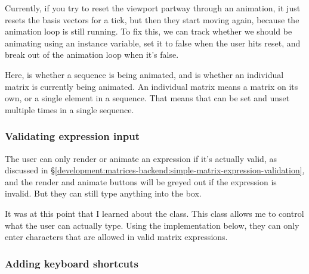 \documentclass[../development.tex]{subfiles}
\begin{document}
Currently, if you try to reset the viewport partway through an animation, it just resets the basis vectors for a tick, but then they start moving again, because the animation loop is still running. To fix this, we can track whether we should be animating using an instance variable, set it to false when the user hits reset, and break out of the animation loop when it's false.



Here,  is whether a sequence is being animated, and  is whether an individual matrix is currently being animated. An individual matrix means a matrix on its own, or a single element in a sequence. That means that  can be set and unset multiple times in a single sequence.

\subsubsection{Validating expression input\label{development:fixing-bugs-and-adding-polish:validating-expression-input}}

The user can only render or animate an expression if it's actually valid, as discussed in \S\ref{development:matrices-backend:simple-matrix-expression-validation}, and the render and animate buttons will be greyed out if the expression is invalid. But they can still type anything into the box.

It was at this point that I learned about the  class\cite{qt5-docs-qvalidator}. This class allows me to control what the user can actually type. Using the implementation below, they can only enter characters that are allowed in valid matrix expressions.



\subsubsection{Adding keyboard shortcuts\label{development:fixing-bugs-and-adding-polish:adding-keyboard-shortcuts}}
\end{document}

